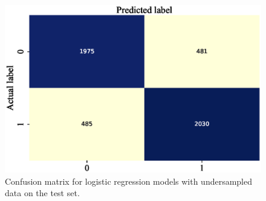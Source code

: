 \documentclass[11pt, a4paper, jou]{apa7}
\begin{document}
\begin{table}[p]
    \centering
    \caption{Classification results of logistic regression model with imbalanced data on the test set. }\label{tab:log_summary}
\end{table}

\begin{figure}[p]
    \centering
    \caption{Confusion matrix for logistic regression models with undersampled data on the test set.}\label{fig:log_cm_undersampling}
    \includegraphics[width=.45\textwidth]{figures/log_cm_undersampling.eps}
\end{figure}

\begin{table}[p]
    \centering
    \caption{Classification results of logistic regression model with undersampled data on the test set. }\label{tab:log_undersampling_summary}
\end{table}
\end{document}

